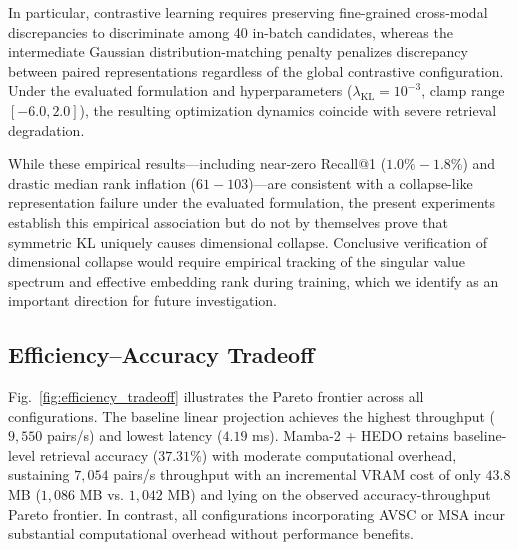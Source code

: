 \documentclass[conference]{IEEEtran}
\begin{document}
In particular, contrastive learning requires preserving fine-grained cross-modal discrepancies to discriminate among 40 in-batch candidates, whereas the intermediate Gaussian distribution-matching penalty penalizes discrepancy between paired representations regardless of the global contrastive configuration. Under the evaluated formulation and hyperparameters ($\lambda_{\mathrm{KL}} = 10^{-3}$, clamp range $[-6.0, 2.0]$), the resulting optimization dynamics coincide with severe retrieval degradation.

While these empirical results---including near-zero Recall@1 ($1.0\%-1.8\%$) and drastic median rank inflation ($61-103$)---are consistent with a collapse-like representation failure under the evaluated formulation, the present experiments establish this empirical association but do not by themselves prove that symmetric KL uniquely causes dimensional collapse. Conclusive verification of dimensional collapse would require empirical tracking of the singular value spectrum and effective embedding rank during training, which we identify as an important direction for future investigation.

\subsection{Efficiency--Accuracy Tradeoff}
Fig.~\ref{fig:efficiency_tradeoff} illustrates the Pareto frontier across all configurations. The baseline linear projection achieves the highest throughput ($9,550$ pairs/s) and lowest latency ($4.19$ ms). Mamba-2 + HEDO retains baseline-level retrieval accuracy ($37.31\%$) with moderate computational overhead, sustaining $7,054$ pairs/s throughput with an incremental VRAM cost of only $43.8$ MB ($1,086$ MB vs. $1,042$ MB) and lying on the observed accuracy-throughput Pareto frontier. In contrast, all configurations incorporating AVSC or MSA incur substantial computational overhead without performance benefits.
\end{document}
